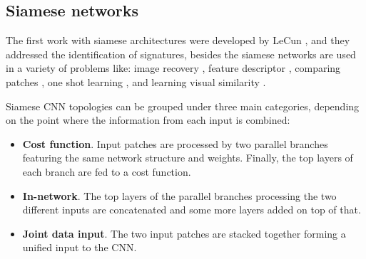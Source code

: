 \subsection{Siamese networks}



The first work with siamese architectures were developed by LeCun \cite{siamLecun}, \cite{siameLecun2} and they addressed the identification of signatures, besides the siamese networks are used in a variety of problems like: image recovery \cite{siameseQuer}, feature descriptor \cite{siameDescri}, comparing patches \cite{patch1}, one shot learning \cite{siameseOne}, and learning visual similarity \cite{siamesSImi}. 

Siamese CNN topologies can be grouped under three main categories, depending on the point where the information from each input is combined:

\begin{itemize}

\item \textbf{Cost function}. Input patches are processed by two parallel branches featuring the same network structure and weights. Finally, the top layers of each branch are fed to a cost function.

\item \textbf{In-network}. The top layers of the parallel branches processing the two different inputs are concatenated and some more layers added on top of that.

\item \textbf{Joint data input}. The two input patches are stacked together forming a unified input to the CNN.

\end{itemize}

